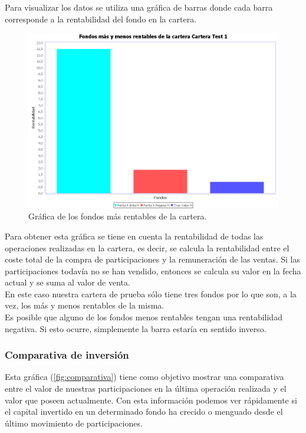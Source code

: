 \documentclass[12pt, a4paper]{book}
\begin{document}
Para visualizar los datos se utiliza una gráfica de barras donde cada barra corresponde a la rentabilidad del fondo en la cartera.\\


	\begin{figure}[htbp]
	\centering
	\includegraphics[width=\textwidth]{figuras/masrentables.PNG}
	\caption{Gráfica de los fondos más rentables de la cartera.}
	\label{fig:masrentables}
	\end {figure}
	
Para obtener esta gráfica se tiene en cuenta la rentabilidad de todas las operaciones realizadas en la cartera, es decir, se calcula la rentabilidad entre el coste total de la compra de participaciones y la remuneración de las ventas. Si las participaciones todavía no se han vendido, entonces se calcula su valor en la fecha actual y se suma al valor de venta.\\

En este caso nuestra cartera de prueba sólo tiene tres fondos por lo que son, a la vez, los más y menos rentables de la misma.\\

Es posible que alguno de los fondos menos rentables tengan una rentabilidad negativa. Si esto ocurre, simplemente la barra estaría en sentido inverso.
	
\newpage
\subsubsection{Comparativa de inversión}

Esta gráfica (\ref{fig:comparativa}) tiene como objetivo mostrar una comparativa entre el valor de nuestras participaciones en la última operación realizada y el valor que poseen actualmente. Con esta información podemos ver rápidamente si el capital invertido en un determinado fondo ha crecido o menguado desde el último movimiento de participaciones.\\
\end{document}
